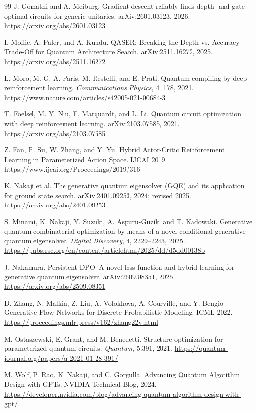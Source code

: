 \documentclass[11pt,a4paper]{article}
\begin{document}
\begin{thebibliography}{99}
J. Gomathi and A. Meiburg.
\newblock Gradient descent reliably finds depth- and gate-optimal circuits for generic unitaries.
\newblock arXiv:2601.03123, 2026.
\newblock \url{https://arxiv.org/abs/2601.03123}

I. Moflic, A. Paler, and A. Kundu.
\newblock QASER: Breaking the Depth vs. Accuracy Trade-Off for Quantum Architecture Search.
\newblock arXiv:2511.16272, 2025.
\newblock \url{https://arxiv.org/abs/2511.16272}

L. Moro, M. G. A. Paris, M. Restelli, and E. Prati.
\newblock Quantum compiling by deep reinforcement learning.
\newblock \emph{Communications Physics}, 4, 178, 2021.
\newblock \url{https://www.nature.com/articles/s42005-021-00684-3}

T. Foelsel, M. Y. Niu, F. Marquardt, and L. Li.
\newblock Quantum circuit optimization with deep reinforcement learning.
\newblock arXiv:2103.07585, 2021.
\newblock \url{https://arxiv.org/abs/2103.07585}

Z. Fan, R. Su, W. Zhang, and Y. Yu.
\newblock Hybrid Actor-Critic Reinforcement Learning in Parameterized Action Space.
\newblock IJCAI 2019.
\newblock \url{https://www.ijcai.org/Proceedings/2019/316}

K. Nakaji et al.
\newblock The generative quantum eigensolver (GQE) and its application for ground state search.
\newblock arXiv:2401.09253, 2024; revised 2025.
\newblock \url{https://arxiv.org/abs/2401.09253}

S. Minami, K. Nakaji, Y. Suzuki, A. Aspuru-Guzik, and T. Kadowaki.
\newblock Generative quantum combinatorial optimization by means of a novel conditional generative quantum eigensolver.
\newblock \emph{Digital Discovery}, 4, 2229--2243, 2025.
\newblock \url{https://pubs.rsc.org/en/content/articlehtml/2025/dd/d5dd00138b}

J. Nakamura.
\newblock Persistent-DPO: A novel loss function and hybrid learning for generative quantum eigensolver.
\newblock arXiv:2509.08351, 2025.
\newblock \url{https://arxiv.org/abs/2509.08351}

D. Zhang, N. Malkin, Z. Liu, A. Volokhova, A. Courville, and Y. Bengio.
\newblock Generative Flow Networks for Discrete Probabilistic Modeling.
\newblock ICML 2022.
\newblock \url{https://proceedings.mlr.press/v162/zhang22v.html}

M. Ostaszewski, E. Grant, and M. Benedetti.
\newblock Structure optimization for parameterized quantum circuits.
\newblock \emph{Quantum}, 5:391, 2021.
\newblock \url{https://quantum-journal.org/papers/q-2021-01-28-391/}

M. Wolf, P. Rao, K. Nakaji, and C. Gorgulla.
\newblock Advancing Quantum Algorithm Design with GPTs.
\newblock NVIDIA Technical Blog, 2024.
\newblock \url{https://developer.nvidia.com/blog/advancing-quantum-algorithm-design-with-gpt/}

\end{thebibliography}
\end{document}
